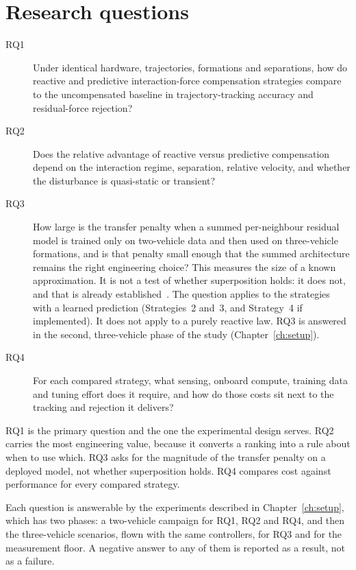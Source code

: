 \section{Research questions}
\label{sec:intro-rq}

\begin{description}
  \item[RQ1] Under identical hardware, trajectories, formations and separations, how do reactive
    and predictive interaction-force compensation strategies compare to the uncompensated baseline
    in trajectory-tracking accuracy and residual-force rejection?

  \item[RQ2] Does the relative advantage of reactive versus predictive compensation depend on the
    interaction regime, separation, relative velocity, and whether the disturbance is
    quasi-static or transient?

  \item[RQ3] How large is the transfer penalty when a summed per-neighbour residual model is
    trained only on two-vehicle data and then used on three-vehicle formations, and is that penalty
    small enough that the summed architecture remains the right engineering choice? This measures
    the size of a known approximation. It is not a test of whether superposition holds: it does
    not, and that is already established~\cite{shi2020neuralswarm,gielis2023aggregate}. The question
    applies to the strategies with a learned prediction (Strategies~2 and~3, and Strategy~4 if
    implemented). It does not apply to a purely reactive law.
    RQ3 is answered in the second, three-vehicle phase of the study (Chapter~\ref{ch:setup}).

  \item[RQ4] For each compared strategy, what sensing, onboard compute, training data and tuning
    effort does it require, and how do those costs sit next to the tracking and rejection it
    delivers?
\end{description}

RQ1 is the primary question and the one the experimental design serves. RQ2 carries the most
engineering value, because it converts a ranking into a rule about when to use which. RQ3 asks for
the magnitude of the transfer penalty on a deployed model, not whether superposition holds.
RQ4 compares cost against performance for every compared strategy.

Each question is answerable by the experiments described in Chapter~\ref{ch:setup}, which has two
phases: a two-vehicle campaign for RQ1, RQ2 and RQ4, and then the three-vehicle scenarios, flown
with the same controllers, for RQ3 and for the measurement floor. A negative answer to any of them
is reported as a result, not as a failure.


